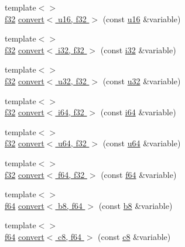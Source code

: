 \begin{DoxyCompactItemize}
\item 
{\footnotesize template$<$$>$ }\\\hyperlink{types_8h_a154db6eda6a99565cb060a1da4b4c930}{f32} \hyperlink{namespacecrap_a0dc179f691d8445ed8c364cef6f0a3fb}{convert$<$ u16, f32 $>$} (const \hyperlink{types_8h_ace9d960e74685e2cd84b36132dbbf8aa}{u16} \&variable)
\item 
{\footnotesize template$<$$>$ }\\\hyperlink{types_8h_a154db6eda6a99565cb060a1da4b4c930}{f32} \hyperlink{namespacecrap_a0d2bd8b4844902f7ed140e1358df3ecb}{convert$<$ i32, f32 $>$} (const \hyperlink{types_8h_a48d6cd8e4135fb2ff7e7f2dac84089ec}{i32} \&variable)
\item 
{\footnotesize template$<$$>$ }\\\hyperlink{types_8h_a154db6eda6a99565cb060a1da4b4c930}{f32} \hyperlink{namespacecrap_a1a08e9737862628c9a84f96f1e3824b0}{convert$<$ u32, f32 $>$} (const \hyperlink{types_8h_afaa62991928fb9fb18ff0db62a040aba}{u32} \&variable)
\item 
{\footnotesize template$<$$>$ }\\\hyperlink{types_8h_a154db6eda6a99565cb060a1da4b4c930}{f32} \hyperlink{namespacecrap_ac8ab8b8dd56f8ae614aad68ca094cc89}{convert$<$ i64, f32 $>$} (const \hyperlink{types_8h_a85cb35fbe5bf2961d7ad5f26814a91a2}{i64} \&variable)
\item 
{\footnotesize template$<$$>$ }\\\hyperlink{types_8h_a154db6eda6a99565cb060a1da4b4c930}{f32} \hyperlink{namespacecrap_a2421f8522af1a7b16d90dbec6a3f5ae5}{convert$<$ u64, f32 $>$} (const \hyperlink{types_8h_a3f7e2bcbb0b4c338f3c4f6c937cd4234}{u64} \&variable)
\item 
{\footnotesize template$<$$>$ }\\\hyperlink{types_8h_a154db6eda6a99565cb060a1da4b4c930}{f32} \hyperlink{namespacecrap_a31b6f3b05f9ccb508b8d03d826f8e531}{convert$<$ f64, f32 $>$} (const \hyperlink{types_8h_a76c9f53497f766e57b184bc8a93ab73f}{f64} \&variable)
\item 
{\footnotesize template$<$$>$ }\\\hyperlink{types_8h_a76c9f53497f766e57b184bc8a93ab73f}{f64} \hyperlink{namespacecrap_a9417e66909609237c518d1e76d7826a8}{convert$<$ b8, f64 $>$} (const \hyperlink{types_8h_a74eb47b4ab9e428eab7b91b3b877fa6c}{b8} \&variable)
\item 
{\footnotesize template$<$$>$ }\\\hyperlink{types_8h_a76c9f53497f766e57b184bc8a93ab73f}{f64} \hyperlink{namespacecrap_a1b4496fa2aaec112877e7f5094a68011}{convert$<$ c8, f64 $>$} (const \hyperlink{types_8h_aa1ba8aac9fcd831012308297336ac74b}{c8} \&variable)

\end{DoxyCompactItemize}

